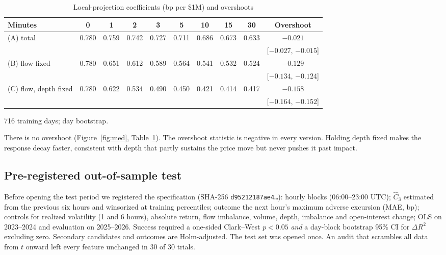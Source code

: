 \begin{table}[t]\centering\small
\begin{threeparttable}
\caption{Local-projection coefficients (bp per \$1M) and overshoots}\label{tab:d4}
\setlength{\tabcolsep}{3.5pt}
\begin{tabular}{lccccccccc}
\toprule
Minutes & 0 & 1 & 2 & 3 & 5 & 10 & 15 & 30 & Overshoot\\
\midrule
(A) total & 0.780 & 0.759 & 0.742 & 0.727 & 0.711 & 0.686 & 0.673 & 0.633 & $-0.021$\\
 & & & & & & & & & [$-0.027$, $-0.015$]\\
(B) flow fixed & 0.780 & 0.651 & 0.612 & 0.589 & 0.564 & 0.541 & 0.532 & 0.524 & $-0.129$\\
 & & & & & & & & & [$-0.134$, $-0.124$]\\
(C) flow, depth fixed & 0.780 & 0.622 & 0.534 & 0.490 & 0.450 & 0.421 & 0.414 & 0.417 & $-0.158$\\
 & & & & & & & & & [$-0.164$, $-0.152$]\\
\bottomrule
\end{tabular}
\begin{tablenotes}\footnotesize\item 716 training days; day bootstrap. \end{tablenotes}
\end{threeparttable}
\end{table}

There is no overshoot (Figure~\ref{fig:med}, Table~\ref{tab:d4}). The overshoot statistic is negative in every version. Holding depth fixed makes the response decay faster, consistent with depth that partly sustains the price move but never pushes it past impact.

\subsection{Pre-registered out-of-sample test}
Before opening the test period we registered the specification (SHA-256 \texttt{d95212187ae4\ldots}): hourly blocks (06:00--23:00 UTC); $\hat C_3$ estimated from the previous six hours and winsorized at training percentiles; outcome the next hour's maximum adverse excursion (MAE, bp); controls for realized volatility (1 and 6 hours), absolute return, flow imbalance, volume, depth, imbalance and open-interest change; OLS on 2023--2024 and evaluation on 2025--2026. Success required a one-sided Clark--West $p<0.05$ \emph{and} a day-block bootstrap 95\% CI for $\Delta R^2$ excluding zero. Secondary candidates and outcomes are Holm-adjusted. The test set was opened once. An audit that scrambles all data from $t$ onward left every feature unchanged in 30 of 30 trials.

